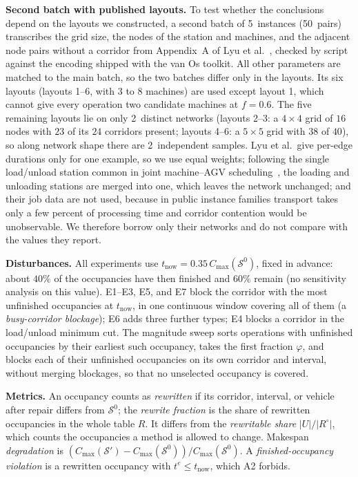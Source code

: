 \documentclass[manuscript,screen,review]{acmart}
\newcommand{\NPubInst}{5}
\newcommand{\NPubPairs}{50}
\newcommand{\NPubNets}{2}
\begin{document}
\textbf{Second batch with published layouts.}
To test whether the conclusions depend on the layouts we constructed, a second batch of \NPubInst\ instances (\NPubPairs\ pairs) transcribes the grid size, the nodes of the station and machines, and the adjacent node pairs without a corridor from Appendix~A of Lyu et al.~\cite{lyu2019approach},
checked by script against the encoding shipped with the van Os toolkit. All other parameters are matched to the main batch, so the two batches differ only in the layouts.
Its six layouts (layouts 1--6, with \(3\) to \(8\) machines) are used except layout 1, which cannot give every operation two candidate machines at \(f=0.6\). The five remaining layouts lie on only \NPubNets\ distinct networks
(layouts 2--3: a \(4\times4\) grid of \(16\) nodes with \(23\) of its \(24\) corridors present; layouts 4--6: a \(5\times5\) grid with \(38\) of \(40\)), so along network shape there are \NPubNets\ independent samples.
Lyu et al.\ give per-edge durations only for one example, so we use equal weights; following the single load/unload station common in joint machine--AGV scheduling~\cite{fontes2023hybrid}, the loading and unloading stations are merged into one, which leaves the network unchanged; and their job data are not used,
because in public instance families transport takes only a few percent of processing time and corridor contention would be unobservable.
We therefore borrow only their networks and do not compare with the values they report.

\textbf{Disturbances.}
All experiments use \(t_{\mathrm{now}}=0.35\,C_{\max}(\mathcal{S}^0)\), fixed in advance: about \(40\%\) of the occupancies have then finished and \(60\%\) remain (no sensitivity analysis on this value). E1--E3, E5, and E7 block the corridor with the most unfinished occupancies at \(t_{\mathrm{now}}\), in one continuous window covering all of them (a \emph{busy-corridor blockage}); E6 adds three further types; E4 blocks a corridor in the load/unload minimum cut.
The magnitude sweep sorts operations with unfinished occupancies by their earliest such occupancy, takes the first fraction \(\varphi\), and blocks each of their unfinished occupancies on its own corridor and interval, without merging blockages, so that no unselected occupancy is covered.

\textbf{Metrics.}
An occupancy counts as \emph{rewritten} if its corridor, interval, or vehicle after repair differs from \(\mathcal{S}^0\); the \emph{rewrite fraction} is the share of rewritten occupancies in the whole table \(R\).
It differs from the \emph{rewritable share} \(|U|/|R^{\circ}|\), which counts the occupancies a method is allowed to change.
Makespan \emph{degradation} is \((C_{\max}(\mathcal{S}')-C_{\max}(\mathcal{S}^0))/C_{\max}(\mathcal{S}^0)\).
A \emph{finished-occupancy violation} is a rewritten occupancy with \(t^e\le t_{\mathrm{now}}\), which A2 forbids.
\end{document}
